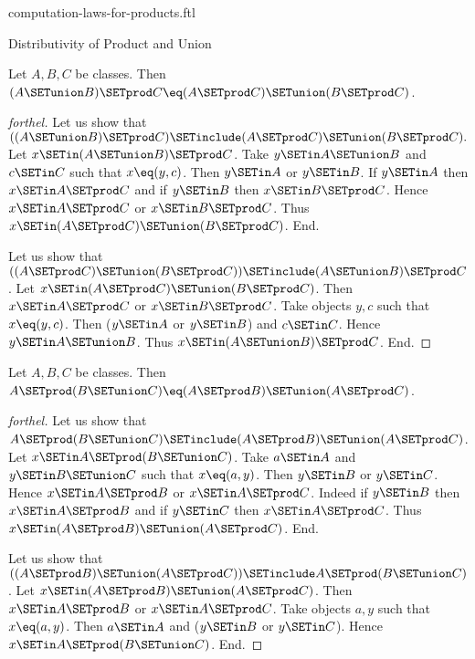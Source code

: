 \documentclass{stex}
\begin{document}
\begin{smodule}{computation-laws-for-products.ftl}
\begin{sfragment}{Distributivity of Product and Union}
  \begin{proposition}[forthel,id=FOUNDATIONS_05_8849658323402752]
    Let $A, B, C$ be classes.
    Then $(A \SETunion B) \SETprod C \eq (A \SETprod C) \SETunion (B \SETprod C)$.
  \end{proposition}
  \begin{proof}[forthel]
    Let us show that $((A \SETunion B) \SETprod C) \SETinclude (A \SETprod C) \SETunion (B \SETprod C).$ %
      Let $x \SETin (A \SETunion B) \SETprod C$.
      Take $y \SETin A \SETunion B$ and $c \SETin C$ such that $x \eq (y, c)$.
      Then $y \SETin A$ or $y \SETin B$.
      If $y \SETin A$ then $x \SETin A \SETprod C$ and if $y \SETin B$ then $x \SETin B \SETprod C$.
      Hence $x \SETin A \SETprod C$ or $x \SETin B \SETprod C$.
      Thus $x \SETin (A \SETprod C) \SETunion (B \SETprod C)$.
    End.

    Let us show that $((A \SETprod C) \SETunion (B \SETprod C)) \SETinclude (A \SETunion B) \SETprod C$. %
      Let $x \SETin (A \SETprod C) \SETunion (B \SETprod C)$.
      Then $x \SETin A \SETprod C$ or $x \SETin B \SETprod C$.
      Take objects $y, c$ such that $x \eq (y, c)$.
      Then ($y \SETin A$ or $y \SETin B$) and $c \SETin C$.
      Hence $y \SETin A \SETunion B$.
      Thus $x \SETin (A \SETunion B) \SETprod C$.
    End.
  \end{proof}

  \begin{proposition}[forthel,id=FOUNDATIONS_05_476526841692160]
    Let $A, B, C$ be classes.
    Then $A \SETprod (B \SETunion C) \eq (A \SETprod B) \SETunion (A \SETprod C)$.
  \end{proposition}
  \begin{proof}[forthel]
    Let us show that $A \SETprod (B \SETunion C) \SETinclude (A \SETprod B) \SETunion (A \SETprod C)$.
      Let $x \SETin A \SETprod (B \SETunion C)$.
      Take $a \SETin A$ and $y \SETin B \SETunion C$ such that $x \eq (a, y)$.
      Then $y \SETin B$ or $y \SETin C$.
      Hence $x \SETin A \SETprod B$ or $x \SETin A \SETprod C$.
      Indeed if $y \SETin B$ then $x \SETin A \SETprod B$ and if $y \SETin C$ then $x \SETin A \SETprod C$.
      Thus $x \SETin (A \SETprod B) \SETunion (A \SETprod C)$.
    End.

    Let us show that $((A \SETprod B) \SETunion (A \SETprod C)) \SETinclude A \SETprod (B \SETunion C)$.
      Let $x \SETin (A \SETprod B) \SETunion (A \SETprod C)$.
      Then $x \SETin A \SETprod B$ or $x \SETin A \SETprod C$.
      Take objects $a, y$ such that $x \eq (a, y)$.
      Then $a \SETin A$ and ($y \SETin B$ or $y \SETin C$).
      Hence $x \SETin A \SETprod (B \SETunion C)$.
    End.
  \end{proof}
\end{sfragment}


\end{smodule}
\end{document}
